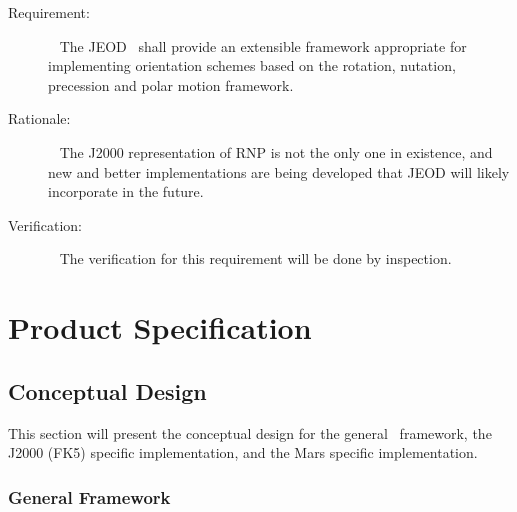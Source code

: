 \label{reqt:RNP_extension}
\begin{description}
\item[Requirement:]\ \newline
The JEOD \ModelDesc\ shall provide an extensible framework appropriate for implementing orientation
schemes based on the rotation, nutation, precession and polar motion framework.
\item[Rationale:]\ \newline
The J2000 representation of RNP is not the only one in existence, and new and better implementations
are being developed that JEOD will likely incorporate in the future.
\item[Verification:]\ \newline
The verification for this requirement will be done by inspection.

\end{description}
%
%      
%   
%
%

\chapter{Product Specification}\label{ch:spec}

\section{Conceptual Design}

This section will present the conceptual design for the general
\ModelDesc\ framework, the J2000 (FK5) specific implementation, and the Mars
specific implementation.

\subsection{General Framework}

